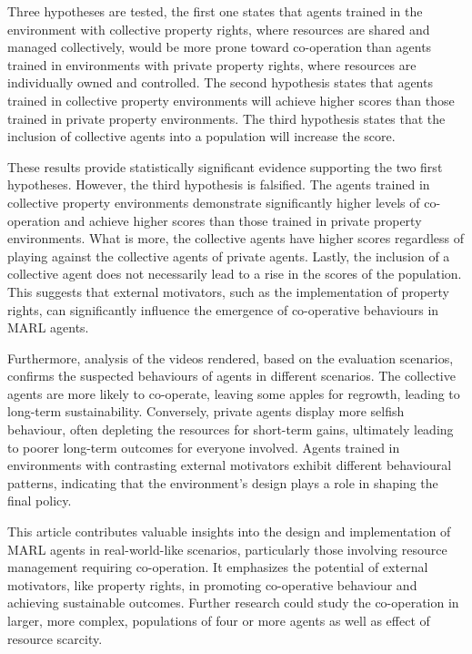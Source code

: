 \documentclass[pdflatex,sn-basic,lineno]{sn-jnl}
\theoremstyle{thmstyleone}%
\theoremstyle{thmstyletwo}%
\theoremstyle{thmstylethree}%
\begin{document}
Three hypotheses are tested, the first one states that agents trained in the environment with collective property
rights, where resources are shared and managed collectively, would be more prone toward co-operation than agents trained
in environments with private property rights, where resources are individually owned and controlled. The second
hypothesis states that agents trained in collective property environments will achieve higher scores than those trained
in private property environments. The third hypothesis states that the inclusion of collective agents into a population
will increase the score.

These results provide statistically significant evidence supporting the two first hypotheses. However, the third
hypothesis is falsified. The agents trained in collective property environments demonstrate significantly higher levels
of co-operation and achieve higher scores than those trained in private property environments. What is more, the
collective agents have higher scores regardless of playing against the collective agents of private agents. Lastly, the
inclusion of a collective agent does not necessarily lead to a rise in the scores of the population. This suggests that
external motivators, such as the implementation of property rights, can significantly influence the emergence of
co-operative behaviours in MARL agents.


Furthermore, analysis of the videos rendered, based on the evaluation scenarios, confirms the suspected behaviours of
agents in different scenarios. The collective agents are more likely to co-operate, leaving some apples for regrowth,
leading to long-term sustainability. Conversely, private agents display more selfish behaviour, often depleting the
resources for short-term gains, ultimately leading to poorer long-term outcomes for everyone involved.
Agents trained in environments with contrasting external motivators exhibit different behavioural patterns, indicating
that the environment's design plays a role in shaping the final policy.

This article contributes valuable insights into the design and implementation of MARL agents in real-world-like
scenarios, particularly those involving resource management requiring co-operation. It emphasizes the potential of
external motivators, like property rights, in promoting co-operative behaviour and achieving sustainable outcomes.
Further research could study the co-operation in larger, more complex, populations of four or more agents as well as
effect of resource scarcity.
\end{document}
